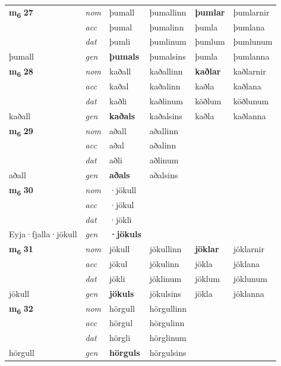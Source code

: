 \begin{longtable}[l]{X>{\footnotesize\itshape}XXXXX}
\multirow{3}{*}{{{\textbf{m{\textsubscript{6}}} \Large{\textbf{27}}}}} & nom & þumall & þumallinn & \textbf{þumlar} & þumlarnir \\*
 & acc & þumal & þumalinn & þumla & þumlana \\*
 & dat & þumli & þumlinum & þumlum & þumlunum \\*
 {\footnotesize{þumall}} & gen & \textbf{þumals} & þumalsins & þumla & þumlanna \\
\cmidrule{1-6}

\multirow{3}{*}{{{\textbf{m{\textsubscript{6}}} \Large{\textbf{28}}}}} & nom & kaðall & kaðallinn & \textbf{kaðlar} & kaðlarnir \\*
 & acc & kaðal & kaðalinn & kaðla & kaðlana \\*
 & dat & kaðli & kaðlinum & köðlum & köðlunum \\*
 {\footnotesize{kaðall}} & gen & \textbf{kaðals} & kaðalsins & kaðla & kaðlanna \\
\cmidrule{1-6}

\multirow{3}{*}{{{\textbf{m{\textsubscript{6}}} \Large{\textbf{29}}}}} & nom & aðall & aðallinn & \textbf{} &  \\*
 & acc & aðal & aðalinn &  &  \\*
 & dat & aðli & aðlinum &  &  \\*
 {\footnotesize{aðall}} & gen & \textbf{aðals} & aðalsins &  &  \\
\cmidrule{1-6}

\multirow{3}{*}{{{\textbf{m{\textsubscript{6}}} \Large{\textbf{30}}}}} & nom & ·jökull &  & \textbf{} &  \\*
 & acc & ·jökul &  &  &  \\*
 & dat & ·jökli &  &  &  \\*
 {\footnotesize{Eyja\allowbreak ·fjalla\allowbreak ·jökull}} & gen & \textbf{·jökuls} &  &  &  \\
\cmidrule{1-6}

\multirow{3}{*}{{{\textbf{m{\textsubscript{6}}} \Large{\textbf{31}}}}} & nom & jökull & jökullinn & \textbf{jöklar} & jöklarnir \\*
 & acc & jökul & jökulinn & jökla & jöklana \\*
 & dat & jökli & jöklinum & jöklum & jöklunum \\*
 {\footnotesize{jökull}} & gen & \textbf{jökuls} & jökulsins & jökla & jöklanna \\
\cmidrule{1-6}

\multirow{3}{*}{{{\textbf{m{\textsubscript{6}}} \Large{\textbf{32}}}}} & nom & hörgull & hörgullinn & \textbf{} &  \\*
 & acc & hörgul & hörgulinn &  &  \\*
 & dat & hörgli & hörglinum &  &  \\*
 {\footnotesize{hörgull}} & gen & \textbf{hörguls} & hörgulsins &  &  \\
\cmidrule{1-6}


\end{longtable}
